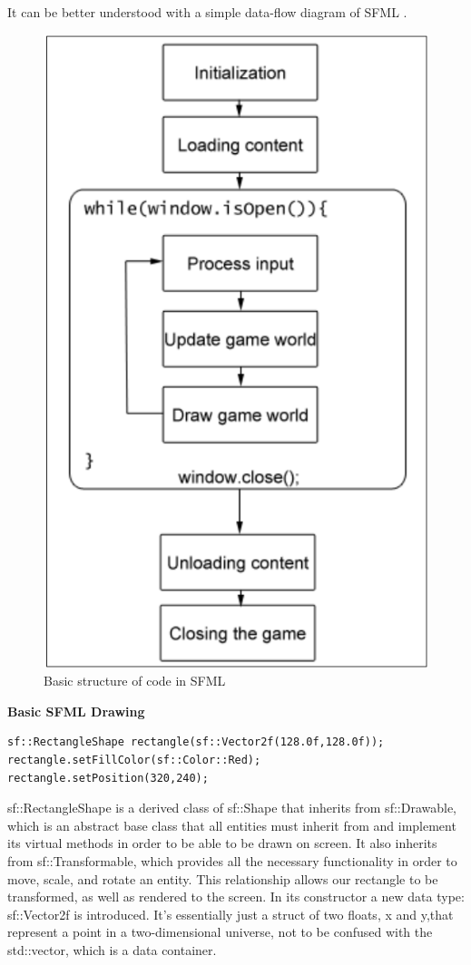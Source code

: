 \documentclass[main]{subfiles}
\begin{document}
It can be better understood with a simple data-flow diagram of SFML .
\begin{figure}[H]
    \centering
    \includegraphics[scale=0.3]{graphics/sfml_basic}
    \caption{Basic structure of code in SFML}
    \label{fig:sfml_structure}
\end{figure}

\textbf{Basic SFML Drawing} 

\begin{verbatim}
sf::RectangleShape rectangle(sf::Vector2f(128.0f,128.0f));
rectangle.setFillColor(sf::Color::Red);
rectangle.setPosition(320,240);
\end{verbatim}
sf::RectangleShape is a derived class of sf::Shape that inherits from
sf::Drawable, which is an abstract base class that all entities must inherit from
and implement its virtual methods in order to be able to be drawn on screen. It also
inherits from sf::Transformable, which provides all the necessary functionality in
order to move, scale, and rotate an entity. This relationship allows our rectangle to be
transformed, as well as rendered to the screen. In its constructor
a new data type: sf::Vector2f is introduced. It's essentially just a struct of two floats, x and y,that represent a point in a two-dimensional universe, not to be confused with the
std::vector, which is a data container.
\end{document}
